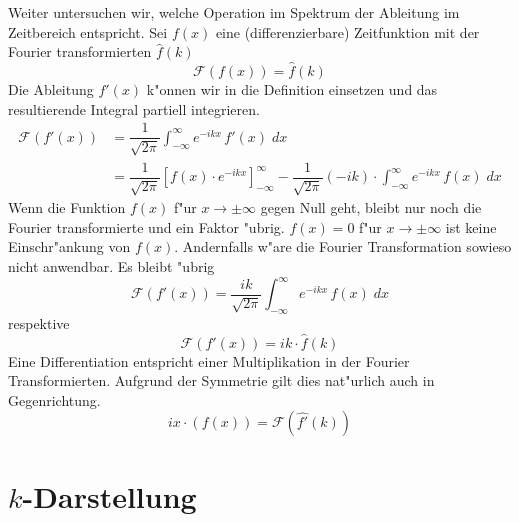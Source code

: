\begin{refsection}
Weiter untersuchen wir, welche Operation im Spektrum der Ableitung im Zeitbereich entspricht.
Sei $f(x)$ eine (differenzierbare) Zeitfunktion mit der Fourier transformierten $\hat{f}(k)$
\begin{equation}
\mathcal{F}(f(x)) = \hat{f}(k)
\end{equation}
Die Ableitung $f'(x)$ k"onnen wir in die Definition einsetzen und das resultierende Integral partiell integrieren. 
\begin{align}
\mathcal{F}(f'(x)) &= \dfrac{1}{\sqrt{2\pi}}\int_{-\infty}^{\infty}e^{-i k x} \, f'(x) \; dx\\
&= \dfrac{1}{\sqrt{2\pi}}\left[f(x)\cdot e^{-i k x} \right]_{-\infty}^{\infty}-  \dfrac{1}{\sqrt{2\pi}}(-ik)\cdot\int_{-\infty}^{\infty}e^{-i k x} \, f(x) \; dx
\end{align}
Wenn die Funktion $f(x)$ f"ur $x \rightarrow \pm \infty$ gegen Null geht, bleibt nur noch die Fourier transformierte und ein Faktor "ubrig.
$f(x) = 0$ f"ur  $x \rightarrow \pm \infty$ ist keine Einschr"ankung von $f(x)$.
Andernfalls w"are die Fourier Transformation sowieso nicht anwendbar.
Es bleibt "ubrig
\begin{equation}
\mathcal{F}(f'(x))= \dfrac{ik}{\sqrt{2\pi}}\int_{-\infty}^{\infty}e^{-i k x} \, f(x) \; dx
\end{equation}
respektive
\begin{equation}
\mathcal{F}(f'(x))= ik\cdot\hat{f}(k)
\end{equation}
Eine Differentiation entspricht einer Multiplikation in der Fourier Transformierten.
Aufgrund der Symmetrie gilt dies nat"urlich auch in Gegenrichtung.
\begin{equation}
ix\cdot(f(x))= \mathcal{F}(\hat{f'}(k))
\end{equation}

\section{$k$-Darstellung}



\end{refsection}
